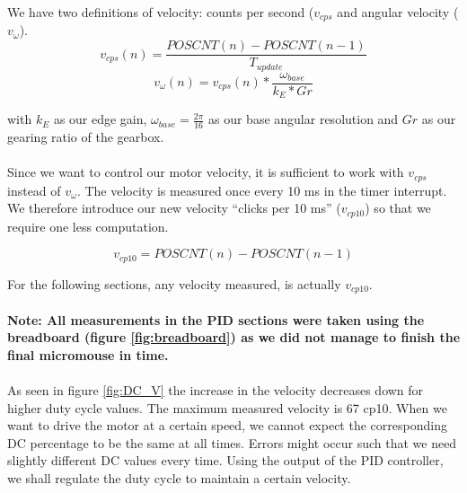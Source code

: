 We have two definitions of velocity: counts per second ($v_{cps}$ and angular velocity ($v_\omega$).
$$v_{cps}(n) = \frac{POSCNT(n) - POSCNT(n-1)}{T_{update}}$$
$$v_{\omega}(n) = v_{cps}(n) * \frac{\omega_{base}}{k_{E}*Gr}$$

with $k_E$ as our edge gain, $\omega_{base} = \frac{2\pi}{16}$ as our base angular resolution and $Gr$ as our gearing ratio of the gearbox.
\\\\
Since we want to control our motor velocity, it is sufficient to work with $v_{cps}$ instead of $v_{\omega}$. 
The velocity is measured once every 10 ms in the timer interrupt.
We therefore introduce our new velocity ``clicks per 10 ms'' ($v_{cp10}$) so that we require one less computation.

$$v_{cp10} = POSCNT(n) - POSCNT(n-1)$$

For the following sections, any velocity measured, is actually $v_{cp10}$.
\\\\
\textbf{Note: All measurements in the PID sections were taken using the breadboard (figure \ref{fig:breadboard}) as we did not manage to finish the final micromouse in time.}
\\\\
As seen in figure \ref{fig:DC_V} the increase in the velocity decreases down for higher duty cycle values. The maximum measured velocity is 67 cp10. When we want to drive the motor at a certain speed, we cannot expect the corresponding DC percentage to be the same at all times. Errors might occur such that we need slightly different DC values every time.
Using the output of the PID controller, we shall regulate the duty cycle to maintain a certain velocity.

